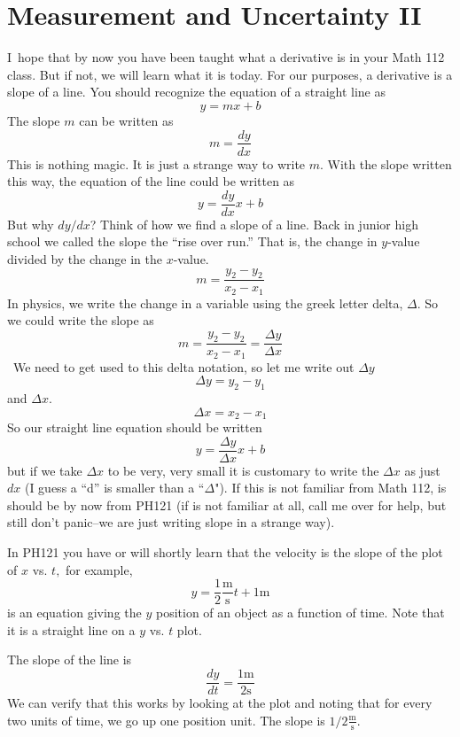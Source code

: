 \documentclass[twoside,11pt,ShortChapTitles]{BYUTextbook}
\begin{document}
\chapter{Measurement and Uncertainty II}

I\ hope that by now you have been taught what a derivative is in your Math 112
class. But if not, we will learn what it is today. For our purposes, a
derivative is a slope of a line. You should recognize the equation of a
straight line as
\[
y=mx+b
\]
The slope $m$ can be written as
\[
m=\frac{dy}{dx}
\]
This is nothing magic. It is just a strange way to write $m.$ With the slope
written this way, the equation of the line could be written as
\[
y=\frac{dy}{dx}x+b
\]
But why $dy/dx$? Think of how we find a slope of a line. Back in junior high
school we called the slope the  ``rise over
run.'' That is, the change in $y$-value divided by the change
in the $x$-value.
\[
m=\frac{y_{2}-y_{2}}{x_{2}-x_{1}}
\]
In physics, we write the change in a variable using the greek letter delta,
$\Delta.$ So we could write the slope as
\[
m=\frac{y_{2}-y_{2}}{x_{2}-x_{1}}=\frac{\Delta y}{\Delta x}
\]
\ We need to get used to this delta notation, so let me write out $\Delta y$
\[
\Delta y=y_{2}-y_{1}
\]
and $\Delta x.$
\[
\Delta x=x_{2}-x_{1}
\]
So our straight line equation should be written
\[
y=\frac{\Delta y}{\Delta x}x+b
\]
but if we take $\Delta x$ to be very, very small it is customary to write the
$\Delta x$ as just $dx$ (I guess a  ``d'' is
smaller than a  ``$\Delta$"). If this is not
familiar from Math 112, is should be by now from PH121 (if is not familiar at
all, call me over for help, but still don't panic--we are just writing slope
in a strange way).

In PH121 you have or will shortly learn that the velocity is the slope of the
plot of $x$ vs. $t,$ for example,
\[
y=\frac{1}{2}\frac{\text{m}}{\text{s}}t+1\text{m}
\]
is an equation giving the $y$ position of an object as a function of time.
Note that it is a straight line on a $y$ vs. $t$ plot.
\begin{center}
\end{center}
The slope of the line is
\[
\frac{dy}{dt}=\frac{1
\text{m}
}{2
\text{s}
}
\]
We can verify that this works by looking at the plot and noting that for every
two units of time, we go up one position unit. The slope is $1/2\frac{
\text{m}
}{
\text{s}
}.$
\end{document}
